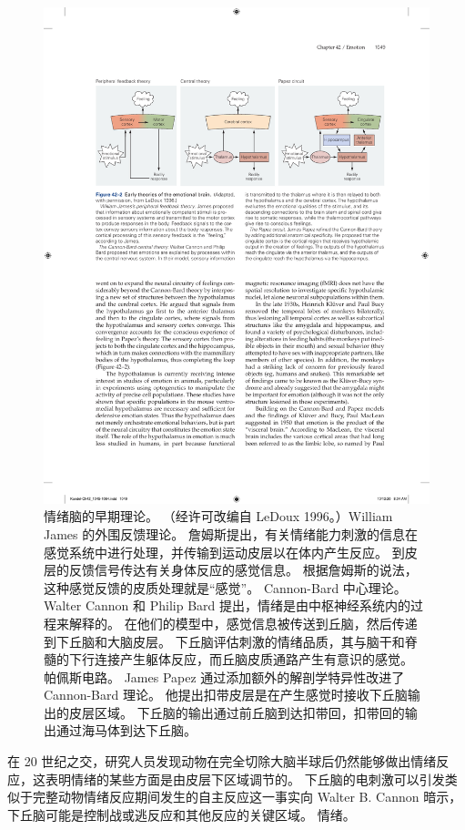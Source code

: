 \begin{figure}[htbp]
	\centering
	\includegraphics[width=0.95\linewidth]{chap42/fig_42_2}
	\caption{情绪脑的早期理论。 （经许可改编自 LeDoux 1996。）William James 的外围反馈理论。 詹姆斯提出，有关情绪能力刺激的信息在感觉系统中进行处理，并传输到运动皮层以在体内产生反应。 到皮层的反馈信号传达有关身体反应的感觉信息。 根据詹姆斯的说法，这种感觉反馈的皮质处理就是“感觉”。 Cannon-Bard 中心理论。 Walter Cannon 和 Philip Bard 提出，情绪是由中枢神经系统内的过程来解释的。 在他们的模型中，感觉信息被传送到丘脑，然后传递到下丘脑和大脑皮层。 下丘脑评估刺激的情绪品质，其与脑干和脊髓的下行连接产生躯体反应，而丘脑皮质通路产生有意识的感觉。 帕佩斯电路。 James Papez 通过添加额外的解剖学特异性改进了 Cannon-Bard 理论。 他提出扣带皮层是在产生感觉时接收下丘脑输出的皮层区域。 下丘脑的输出通过前丘脑到达扣带回，扣带回的输出通过海马体到达下丘脑。}
	\label{fig:42_2}
\end{figure}

在 20 世纪之交，研究人员发现动物在完全切除大脑半球后仍然能够做出情绪反应，这表明情绪的某些方面是由皮层下区域调节的。 下丘脑的电刺激可以引发类似于完整动物情绪反应期间发生的自主反应这一事实向 Walter B. Cannon 暗示，下丘脑可能是控制战或逃反应和其他反应的关键区域。 情绪。

